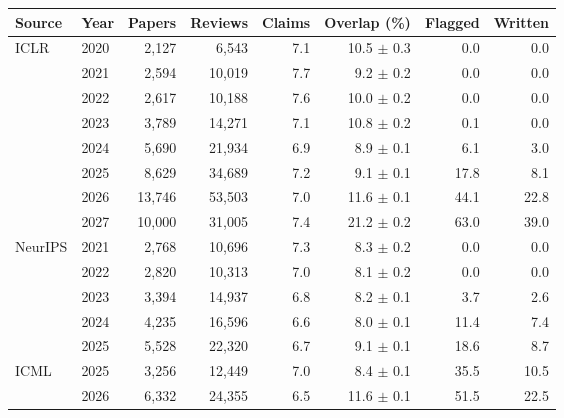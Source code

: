 \begin{tabular}{llrrrrrr}
\toprule
Source & Year & Papers & Reviews & Claims & Overlap (\%) & Flagged & Written \\
\midrule
ICLR & 2020 & 2,127 & 6,543 & 7.1 & 10.5 $\pm$ 0.3 & 0.0 & 0.0 \\
 & 2021 & 2,594 & 10,019 & 7.7 & 9.2 $\pm$ 0.2 & 0.0 & 0.0 \\
 & 2022 & 2,617 & 10,188 & 7.6 & 10.0 $\pm$ 0.2 & 0.0 & 0.0 \\
 & 2023 & 3,789 & 14,271 & 7.1 & 10.8 $\pm$ 0.2 & 0.1 & 0.0 \\
 & 2024 & 5,690 & 21,934 & 6.9 & 8.9 $\pm$ 0.1 & 6.1 & 3.0 \\
 & 2025 & 8,629 & 34,689 & 7.2 & 9.1 $\pm$ 0.1 & 17.8 & 8.1 \\
 & 2026 & 13,746 & 53,503 & 7.0 & 11.6 $\pm$ 0.1 & 44.1 & 22.8 \\
 & 2027 & 10,000 & 31,005 & 7.4 & 21.2 $\pm$ 0.2 & 63.0 & 39.0 \\
\midrule
NeurIPS & 2021 & 2,768 & 10,696 & 7.3 & 8.3 $\pm$ 0.2 & 0.0 & 0.0 \\
 & 2022 & 2,820 & 10,313 & 7.0 & 8.1 $\pm$ 0.2 & 0.0 & 0.0 \\
 & 2023 & 3,394 & 14,937 & 6.8 & 8.2 $\pm$ 0.1 & 3.7 & 2.6 \\
 & 2024 & 4,235 & 16,596 & 6.6 & 8.0 $\pm$ 0.1 & 11.4 & 7.4 \\
 & 2025 & 5,528 & 22,320 & 6.7 & 9.1 $\pm$ 0.1 & 18.6 & 8.7 \\
\midrule
ICML & 2025 & 3,256 & 12,449 & 7.0 & 8.4 $\pm$ 0.1 & 35.5 & 10.5 \\
 & 2026 & 6,332 & 24,355 & 6.5 & 11.6 $\pm$ 0.1 & 51.5 & 22.5 \\
\bottomrule
\end{tabular}
